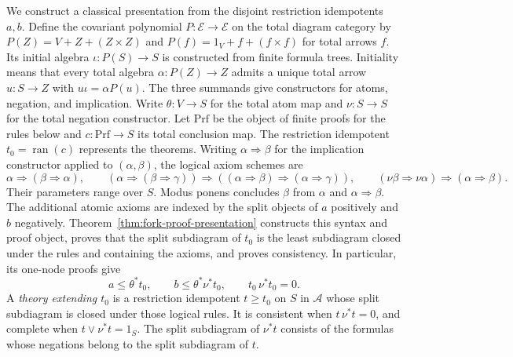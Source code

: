 \documentclass[11pt]{article}
\newcommand{\ran}{\operatorname{ran}}
\begin{document}
We construct a classical presentation from the disjoint restriction idempotents $a,b$.
Define the covariant polynomial
$P:\mathcal E\to\mathcal E$ on the total diagram category by
$P(Z)=V+Z+(Z\times Z)$ and
$P(f)=1_V+f+(f\times f)$ for total arrows $f$.
Its initial algebra $\iota:P(S)\to S$ is constructed from finite
formula trees. Initiality means that every total algebra
$\alpha:P(Z)\to Z$ admits a unique total arrow $u:S\to Z$
with $u\iota=\alpha P(u)$.
The three summands give constructors for atoms, negation, and implication.
Write $\theta:V\to S$ for the total atom map
and $\nu:S\to S$ for the total negation constructor.
Let $\mathrm{Prf}$ be the object of finite proofs for the rules below
and $c:\mathrm{Prf}\to S$ its total conclusion map.
The restriction idempotent $t_0=\ran(c)$ represents the theorems.
Writing $\alpha\Rightarrow\beta$ for the implication constructor
applied to $(\alpha,\beta)$, the logical axiom schemes are
\[
 \alpha\Rightarrow(\beta\Rightarrow\alpha),\qquad
 (\alpha\Rightarrow(\beta\Rightarrow\gamma))
   \Rightarrow((\alpha\Rightarrow\beta)\Rightarrow
                         (\alpha\Rightarrow\gamma)),\qquad
 (\nu\beta\Rightarrow\nu\alpha)\Rightarrow(\alpha\Rightarrow\beta).
\]
Their parameters range over $S$. Modus ponens concludes $\beta$
from $\alpha$ and $\alpha\Rightarrow\beta$.
The additional atomic axioms are indexed by the split objects
of $a$ positively and $b$ negatively.
Theorem~\ref{thm:fork-proof-presentation} constructs this syntax and
proof object, proves that the split subdiagram of $t_0$ is the least
subdiagram closed under the rules and containing the axioms, and proves
consistency. In particular, its one-node proofs give
\begin{equation}\label{eq:atomic-inequalities}
 a\le\theta^*t_0,\qquad
 b\le\theta^*\nu^*t_0,\qquad t_0\,\nu^*t_0=0.
\end{equation}
A \emph{theory extending $t_0$} is a restriction idempotent $t\ge t_0$
on $S$ in $\mathcal A$ whose split subdiagram is closed under those
logical rules.
It is consistent when $t\,\nu^*t=0$, and complete when
$t\vee\nu^*t=1_S$. The split subdiagram of $\nu^*t$ consists of the formulas whose
negations belong to the split subdiagram of $t$.
\end{document}
